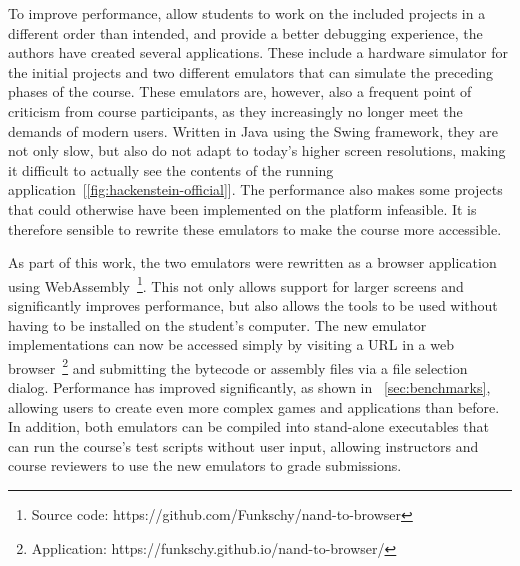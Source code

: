 To improve performance, allow students to work on the included projects in a different order than intended, and provide a better debugging experience, the authors have created several applications.
These include a hardware simulator for the initial projects and two different emulators that can simulate the preceding phases of the course.
These emulators are, however, also a frequent point of criticism from course participants, as they increasingly no longer meet the demands of modern users.
Written in Java using the Swing framework, they are not only slow, but also do not adapt to today's higher screen resolutions, making it difficult to actually see the contents of the running application~[\ref{fig:hackenstein-official}].
The performance also makes some projects that could otherwise have been implemented on the platform infeasible.
It is therefore sensible to rewrite these emulators to make the course more accessible.

As part of this work, the two emulators were rewritten as a browser application using WebAssembly~\footnote{Source code: https://github.com/Funkschy/nand-to-browser}.
This not only allows support for larger screens and significantly improves performance, but also allows the tools to be used without having to be installed on the student's computer.
The new emulator implementations can now be accessed simply by visiting a URL in a web browser~\footnote{Application: https://funkschy.github.io/nand-to-browser/} and submitting the bytecode or assembly files via a file selection dialog. Performance has improved significantly, as shown in ~\cref{sec:benchmarks}, allowing users to create even more complex games and applications than before.
In addition, both emulators can be compiled into stand-alone executables that can run the course's test scripts without user input, allowing instructors and course reviewers to use the new emulators to grade submissions.
